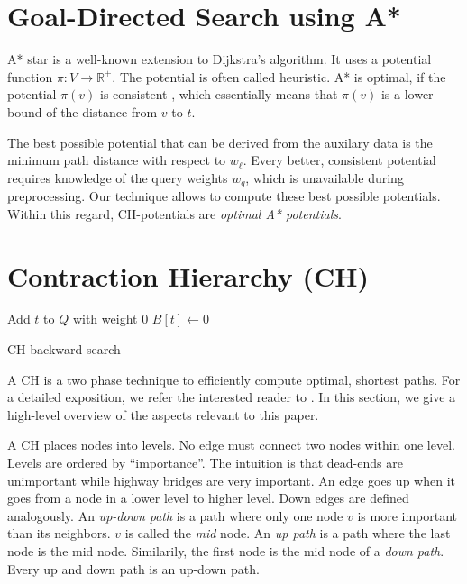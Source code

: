 \documentclass[a4paper,UKenglish,cleveref, autoref]{lipics-v2019}
\begin{document}
\section{Goal-Directed Search using A*}

A* star is a well-known extension to Dijkstra's algorithm.
It uses a potential function $\pi:V\rightarrow \mathbb{R}^+$.
The potential is often called heuristic.
A* is optimal, if the potential $\pi(v)$ is consistent \cite{Pearl, Judea (1984). Heuristics: Intelligent Search Strategies for Computer Problem Solving. Addison-Wesley. ISBN 0-201-05594-5.}, which essentially means that $\pi(v)$ is a lower bound of the distance from $v$ to $t$.

The best possible potential that can be derived from the auxilary data is the minimum path distance with respect to $w_\ell$.
Every better, consistent potential requires knowledge of the query weights $w_q$, which is unavailable during preprocessing.
Our technique allows to compute these best possible potentials.
Within this regard, CH-potentials are \emph{optimal A* potentials}.

\section{Contraction Hierarchy (CH)}

\begin{algorithm2e}
Add $t$ to $Q$ with weight 0\;
$B[t] \leftarrow 0$\;
\caption{CH backward search}
\label{algo:ch-backward}
\end{algorithm2e}

A CH is a two phase technique to efficiently compute optimal, shortest paths.
For a detailed exposition, we refer the interested reader to \cite{CCH, CH}.
In this section, we give a high-level overview of the aspects relevant to this paper.

A CH places nodes into levels.
No edge must connect two nodes within one level.
Levels are ordered by ``importance''.
The intuition is that dead-ends are unimportant while highway bridges are very important.
An edge goes up when it goes from a node in a lower level to higher level.
Down edges are defined analogously.
An \emph{up-down path} is a path where only one node $v$ is more important than its neighbors.
$v$ is called the \emph{mid} node.
An \emph{up path} is a path where the last node is the mid node.
Similarily, the first node is the mid node of a \emph{down path}.
Every up and down path is an up-down path.
\end{document}
